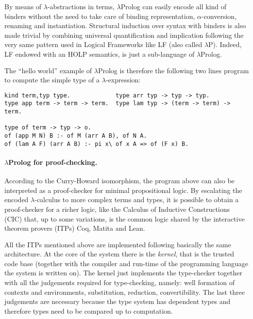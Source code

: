 \documentclass{easychair}
\begin{document}
By means of $\lambda$-abstractions in terms, $\lambda$Prolog can
easily encode all kind of binders without the need to take care of
binding representation, $\alpha$-conversion, renaming and
instantiation. Structural induction over syntax with binders is also
made trivial by combining universal quantification and implication
following the very same pattern used in Logical Frameworks like LF
(also called $\lambda$P). Indeed, LF endowed with an HOLP semantics,
is just a sub-language of
$\lambda$Prolog.

The ``hello world'' example of $\lambda$Prolog is therefore the
following two lines program to compute the simple type of a
$\lambda$-expression:

\begin{Verbatim}
kind term,typ type.             type arr typ -> typ -> typ.
type app term -> term -> term.  type lam typ -> (term -> term) -> term.

type of term -> typ -> o.
of (app M N) B :- of M (arr A B), of N A.
of (lam A F) (arr A B) :- pi x\ of x A => of (F x) B.
\end{Verbatim}

\paragraph{$\lambda$Prolog for proof-checking.}

According to the Curry-Howard isomorphism, the program above can also
be interpreted as a proof-checker for minimal propositional logic. By
escalating the encoded $\lambda$-calculus to more complex terms and
types, it is possible to obtain a proof-checker for a richer
logic, like the Calculus of Inductive Constructions (CIC) that, up to some
variations, is the common logic shared by the interactive theorem
provers (ITPs) Coq, Matita and Lean. %

All the ITPs mentioned above are implemented following
basically the same architecture. At the core of the system there is
the \emph{kernel}, that is the trusted code base (together with the
compiler and run-time of the programming language the system is
written on). The kernel just implements the type-checker together with
all the judgements required for type-checking, namely: well formation
of contexts and environments, substitution, reduction, convertibility.
The last three judgements are necessary because the type system has
dependent types and therefore types need to be compared up to
computation.
\end{document}
